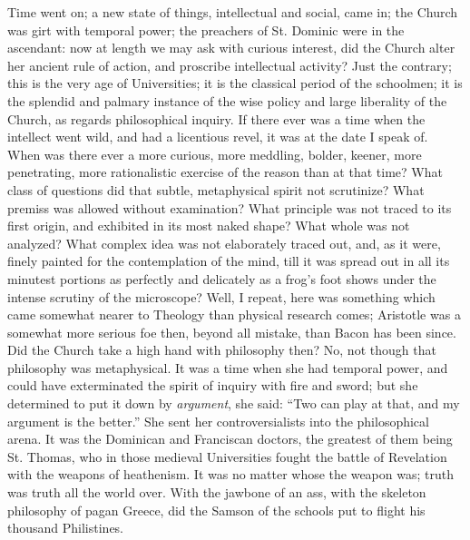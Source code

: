 Time went on; a new state of things, intellectual and social, came
in; the Church was girt with temporal power; the preachers of St.
Dominic were in the ascendant: now at length we may ask with curious
interest, did the Church alter her ancient rule of action, and
proscribe intellectual activity? Just the contrary; this is the very
age of Universities; it is the classical period of the schoolmen; it
is the splendid and palmary instance of the wise policy and large
liberality of the Church, as regards philosophical inquiry. If there
ever was a time when the intellect went wild, and had a licentious
revel, it was at the date I speak of. When was there ever a more
curious, more meddling, bolder, keener, more penetrating, more
rationalistic exercise of the reason than at that time? What class of
questions did that subtle, metaphysical spirit not scrutinize? What
premiss was allowed without examination? What principle was not traced
to its first origin, and exhibited in its most naked shape? What whole
was not analyzed? What complex idea was not elaborately traced out,
and, as it were, finely painted for the contemplation of the mind,
till it was spread out in all its minutest portions as perfectly and
delicately as a frog's foot shows under the intense scrutiny of the
microscope? Well, I repeat, here was something which came somewhat
nearer to Theology than physical research comes; Aristotle was a
somewhat more serious foe then, beyond all mistake, than Bacon has
been since. Did the Church take a high hand with philosophy then? No,
not though that philosophy was metaphysical. It was a time when she
had temporal power, and could have exterminated the spirit of inquiry
with fire and sword; but she determined to put it down by \emph{argument}, she said: ``Two can play at that, and my argument is the
better.'' She sent her controversialists into the philosophical
arena. It was the Dominican and Franciscan doctors, the greatest of
them being St. Thomas, who in those medieval Universities fought the
battle of Revelation with the weapons of heathenism. It was no matter
whose the weapon was; truth was truth all the world over. With the
jawbone of an ass, with the skeleton philosophy of pagan Greece, did
the Samson of the schools put to flight his thousand Philistines.


